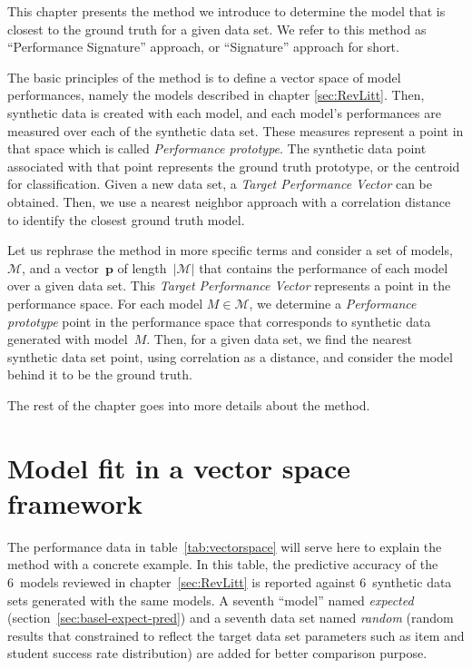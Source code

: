 \label{sec:Approach}

This chapter presents the method we introduce to determine the model that is closest to the ground truth for a given data set.  We refer to this method as ``Performance Signature'' approach, or ``Signature'' approach for short. 

The basic principles of the method is to define a vector space of model performances, namely the models described in chapter \ref{sec:RevLitt}.  Then, synthetic data is created with each model, and each model's performances are measured over each of the synthetic data set.  These measures represent a point in that space which is called \textit{Performance prototype}. The synthetic data point associated with that point represents the ground truth prototype, or the centroid for classification.  Given a new data set, a \textit{Target Performance Vector} can be obtained. Then, we use a nearest neighbor approach with a correlation distance to identify the closest ground truth model.

Let us rephrase the method in more specific terms and consider a set of models, $\mathcal{M}$, and a vector~$\mathbf{p}$ of length~$|\mathcal{M}|$ that contains the performance of each model over a given data set.  This \textit{Target Performance Vector} represents a point in the performance space.  For each model $M \in \mathcal{M}$, we determine a \textit{Performance prototype} point in the performance space that corresponds to synthetic data generated with model~$M$.  Then, for a given data set, we find the nearest synthetic data set point, using correlation as a distance, and consider the model behind it to be the ground truth.


The rest of the chapter goes into more details about the method.

\section{Model fit in a vector space framework}

The performance data in table~\ref{tab:vectorspace} will serve here to explain the method with a concrete example.  In this table, the predictive accuracy of the 6~models reviewed in chapter~\ref{sec:RevLitt} is reported against 6~synthetic data sets generated with the same models.  A seventh ``model'' named \textit{expected} (section~\ref{sec:basel-expect-pred}) and a seventh data set named \textit{random} (random results that constrained to reflect the target data set parameters such as item and student success rate distribution) are added for better comparison purpose.  

